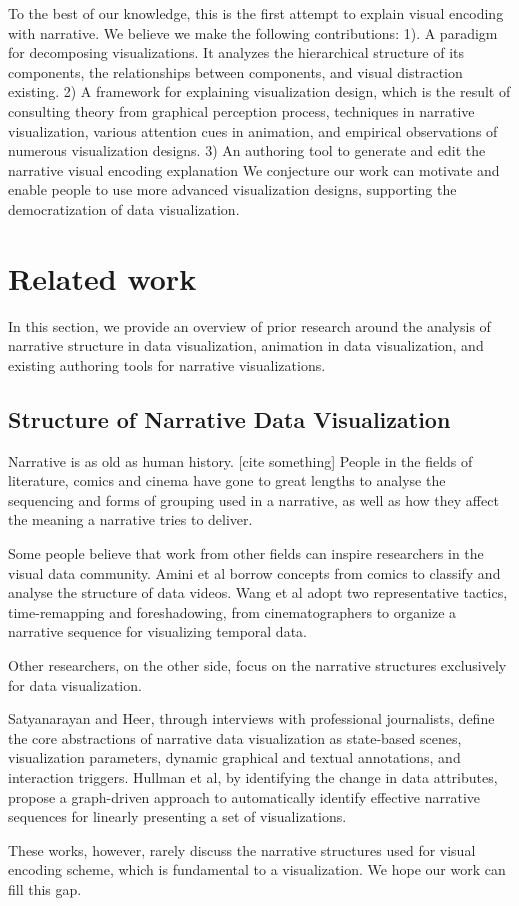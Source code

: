 \documentclass[review,journal]{vgtc}         %
\begin{document}
To the best of our knowledge, this is the first attempt to explain visual encoding with narrative. We believe we make the following contributions: 1). A paradigm for decomposing visualizations. It analyzes the hierarchical structure of its components, the relationships between components, and visual distraction existing. 2) A framework for explaining visualization design, which is the result of consulting theory from graphical perception process, techniques in narrative visualization, various attention cues in animation, and empirical observations of numerous visualization designs. 3) An authoring tool to generate and edit the narrative visual encoding explanation
 We conjecture our work can motivate and enable people to use more advanced visualization designs, supporting the democratization of data visualization.\par
\section {Related work}
In this section, we provide an overview of prior research around the analysis of narrative structure in data visualization, animation in data visualization, and existing authoring tools for narrative visualizations.\par
\subsection{Structure of Narrative Data Visualization}
Narrative is as old as human history. [cite something] People in the fields of literature, comics \cite{cohn_visual_2013} and cinema \cite{schmidt_living_2017} have gone to great lengths to analyse the sequencing and forms of grouping used in a narrative, as well as how they affect the meaning a narrative tries to deliver. \par
Some people believe that work from other fields can inspire researchers in the visual data community. Amini et al\cite{amini_understanding_2015} borrow concepts from comics \cite{cohn_visual_2013} to classify and analyse the structure of data videos. Wang et al \cite{wang_animated_2016} adopt two representative tactics, time-remapping and foreshadowing, from cinematographers to organize a narrative sequence for visualizing temporal data. \par
Other researchers, on the other side, focus on the narrative structures exclusively for data visualization. \par
Satyanarayan and Heer, through interviews with professional journalists\cite{satyanarayan_authoring_2014}, define the core abstractions of narrative data visualization as state-based scenes, visualization parameters, dynamic graphical and textual annotations, and interaction triggers. Hullman et al\cite{hullman_deeper_2013}, by identifying the change in data attributes, propose a graph-driven approach to automatically identify effective narrative sequences for linearly presenting a set of visualizations. \par
These works, however, rarely discuss the narrative structures used for visual encoding scheme, which is fundamental to a visualization. We hope our work can fill this gap.\par
\end{document}
